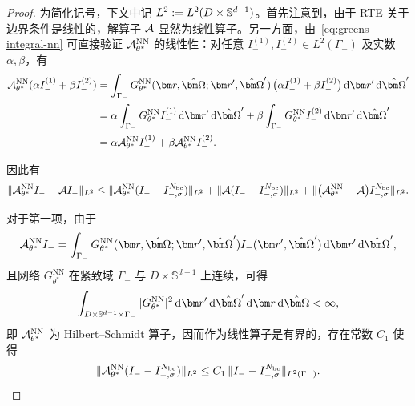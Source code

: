 \begin{proof}
    为简化记号，下文中记 $L^2:=L^2(D\times\mathbb{S}^{d-1})$。首先注意到，由于 RTE 关于边界条件是线性的，解算子 $\mathcal{A}$ 显然为线性算子。另一方面，由~\eqref{eq:greens-integral-nn} 可直接验证 $\mathcal{A}^{\text{NN}}_{\theta^*}$ 的线性性：对任意 $I_{-}^{(1)}, I_{-}^{(2)}\in L^2(\Gamma_-)$ 及实数 $\alpha,\beta$，有
    \begin{equation}
        \begin{aligned}
            \ANN_{\theta^*}(\alpha I_{-}^{(1)} + \beta I_{-}^{(2)})
             & =\int_{\Gamma_-} G^{\text{NN}}_{\theta^*}(\br, \bOmega; \br', \bOmega')\,\big(\alpha I_{-}^{(1)} + \beta I_{-}^{(2)}\big) \,\mathrm{d}{\br'} \,\mathrm{d}{\bOmega'}                                          \\
             & =\alpha\int_{\Gamma_-} G^{\text{NN}}_{\theta^*} I_{-}^{(1)} \,\mathrm{d}{\br'} \,\mathrm{d}{\bOmega'} + \beta \int_{\Gamma_-} G^{\text{NN}}_{\theta^*} I_{-}^{(2)} \,\mathrm{d}{\br'} \,\mathrm{d}{\bOmega'} \\
             & =\alpha \ANN_{\theta^*} I_{-}^{(1)} + \beta \ANN_{\theta^*} I_{-}^{(2)}.
        \end{aligned}
    \end{equation}

    因此有
    \begin{equation}\label{eq:error_estimate_split}
        \|\mathcal{A}^{\text{NN}}_{\theta^*} I_- - \mathcal{A} I_-\|_{L^2}
        \leq \|\mathcal{A}^{\text{NN}}_{\theta^*} (I_- - I^{N_{\text{bc}}}_{-,\sigma})\|_{L^2} + \|\mathcal{A} (I_- - I^{N_{\text{bc}}}_{-,\sigma})\|_{L^2} + \|\big(\mathcal{A}^{\text{NN}}_{\theta^*} - \mathcal{A}\big) I^{N_{\text{bc}}}_{-,\sigma}\|_{L^2} .
    \end{equation}

    对于第一项，由于
    \begin{equation}
        \ANN_{\theta^*} I_{-} = \int_{\Gamma_-} G^{\text{NN}}_{\theta^*}(\br, \bOmega; \br', \bOmega') I_{-}(\br', \bOmega') \,\mathrm{d}{\br'} \,\mathrm{d}{\bOmega'},
    \end{equation}
    且网络 $G^{\text{NN}}_{\theta^*}$ 在紧致域 $\Gamma_-$ 与 $D \times \mathbb{S}^{d-1}$ 上连续，可得
    \begin{equation}
        \int_{D \times \mathbb{S}^{d-1}\times \Gamma_-} |G^{\text{NN}}_{\theta^*}|^2 \,\mathrm{d}{\br'} \,\mathrm{d}{\bOmega'} \,\mathrm{d}{\br} \,\mathrm{d}{\bOmega} < \infty,
    \end{equation}
    即 $\mathcal{A}^{\text{NN}}_{\theta^*}$ 为 Hilbert–Schmidt 算子，因而作为线性算子是有界的，存在常数 $C_1$ 使得
    \begin{equation}\label{eq:error_estimate_1_cn}
        \|\mathcal{A}^{\text{NN}}_{\theta^*} (I_- - I^{N_{\text{bc}}}_{-,\sigma})\|_{L^2} \leq C_1 \,\|I_- - I^{N_{\text{bc}}}_{-,\sigma}\|_{L^2(\Gamma_-)}.
    \end{equation}


\end{proof}
